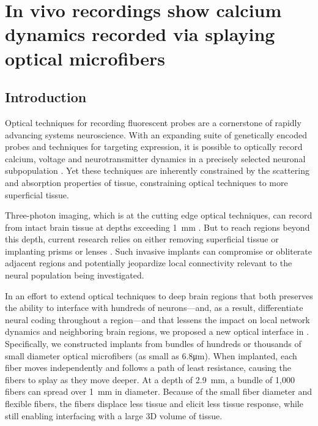 \chapter{In vivo recordings show calcium dynamics recorded via splaying optical microfibers}

\label{chapter:recording}
\thispagestyle{myheadings}

\graphicspath{{5_Recording/Figures/}}


\section{Introduction}

Optical techniques for recording fluorescent probes are a cornerstone 
of rapidly advancing systems neuroscience. With an expanding suite of 
genetically encoded probes and techniques for targeting expression, it
 is possible to optically record calcium, voltage and neurotransmitter
 dynamics in a precisely selected neuronal subpopulation 
\cite{Emiliani:2015jl,Gong:2015is}. Yet these techniques are 
inherently constrained by the scattering and absorption properties of 
tissue, constraining optical techniques to more superficial tissue.



Three-photon imaging, which is at the cutting edge optical techniques,
 can record from intact brain tissue at depths exceeding 
1~\si{\milli\meter} \cite{Horton:2013gxa,Wang:2017jp}. But to reach 
regions beyond this depth, current research relies on either removing 
superficial tissue \cite{Dombeck:2010jr} or implanting prisms or 
lenses \cite{Jung:2004kv,Barretto:2009hk,Andermann:2013kc,Cui:2013dq}.
 Such invasive implants can compromise or obliterate adjacent regions 
and potentially jeopardize local connectivity relevant to the neural 
population being investigated.



In an effort to extend optical techniques to deep brain regions that 
both preserves the ability to interface with hundreds of 
neurons---and, as a result, differentiate neural coding throughout a 
region---and that lessens the impact on local network dynamics and 
neighboring brain regions, we proposed a new optical interface in 
. Specifically, we constructed implants from 
bundles of hundreds or thousands of small diameter optical microfibers
 (as small as 6.8\si{\micro\meter}). When implanted, each fiber moves 
independently and follows a path of least resistance, causing the 
fibers to splay as they move deeper. At a depth of 
2.9~\si{\milli\meter}, a bundle of 1,000 fibers can spread over 
1~\si{\milli\meter} in diameter. Because of the small fiber diameter 
and flexible fibers, the fibers displace less tissue and elicit less 
tissue response, while still enabling interfacing with a large 3D 
volume of tissue.



